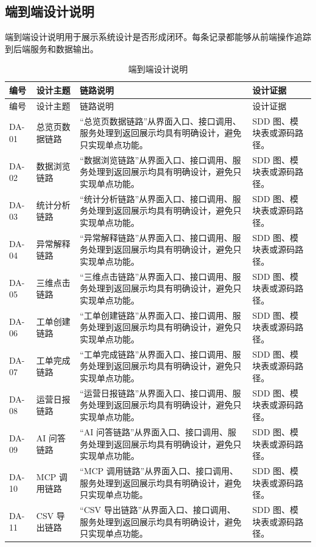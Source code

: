 \documentclass[12pt,a4paper]{ctexart}
\begin{document}
\subsection{端到端设计说明}
端到端设计说明用于展示系统设计是否形成闭环。每条记录都能够从前端操作追踪到后端服务和数据输出。
\begin{longtable}{L{1.7cm}L{4.0cm}L{6.2cm}L{3.6cm}}
\caption{端到端设计说明}\\
\toprule
编号 & 设计主题 & 链路说明 & 设计证据 \\
\midrule
\endfirsthead
\toprule
编号 & 设计主题 & 链路说明 & 设计证据 \\
\midrule
\endhead
DA-01 & 总览页数据链路 & “总览页数据链路”从界面入口、接口调用、服务处理到返回展示均具有明确设计，避免只实现单点功能。 & SDD 图、模块表或源码路径。 \\
DA-02 & 数据浏览链路 & “数据浏览链路”从界面入口、接口调用、服务处理到返回展示均具有明确设计，避免只实现单点功能。 & SDD 图、模块表或源码路径。 \\
DA-03 & 统计分析链路 & “统计分析链路”从界面入口、接口调用、服务处理到返回展示均具有明确设计，避免只实现单点功能。 & SDD 图、模块表或源码路径。 \\
DA-04 & 异常解释链路 & “异常解释链路”从界面入口、接口调用、服务处理到返回展示均具有明确设计，避免只实现单点功能。 & SDD 图、模块表或源码路径。 \\
DA-05 & 三维点击链路 & “三维点击链路”从界面入口、接口调用、服务处理到返回展示均具有明确设计，避免只实现单点功能。 & SDD 图、模块表或源码路径。 \\
DA-06 & 工单创建链路 & “工单创建链路”从界面入口、接口调用、服务处理到返回展示均具有明确设计，避免只实现单点功能。 & SDD 图、模块表或源码路径。 \\
DA-07 & 工单完成链路 & “工单完成链路”从界面入口、接口调用、服务处理到返回展示均具有明确设计，避免只实现单点功能。 & SDD 图、模块表或源码路径。 \\
DA-08 & 运营日报链路 & “运营日报链路”从界面入口、接口调用、服务处理到返回展示均具有明确设计，避免只实现单点功能。 & SDD 图、模块表或源码路径。 \\
DA-09 & AI 问答链路 & “AI 问答链路”从界面入口、接口调用、服务处理到返回展示均具有明确设计，避免只实现单点功能。 & SDD 图、模块表或源码路径。 \\
DA-10 & MCP 调用链路 & “MCP 调用链路”从界面入口、接口调用、服务处理到返回展示均具有明确设计，避免只实现单点功能。 & SDD 图、模块表或源码路径。 \\
DA-11 & CSV 导出链路 & “CSV 导出链路”从界面入口、接口调用、服务处理到返回展示均具有明确设计，避免只实现单点功能。 & SDD 图、模块表或源码路径。 \\

\end{longtable}
\end{document}

